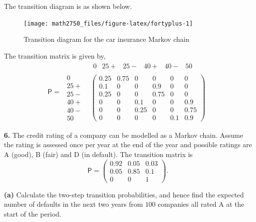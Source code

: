 \documentclass[
  a4paper,
]{article}
\theoremstyle{definition}
\theoremstyle{definition}
\theoremstyle{definition}
\theoremstyle{remark}
\begin{document}
\begin{myanswers}
The transition diagram is as shown below.

\begin{figure}

{\centering \texttt{[image: math2750\_files/figure-latex/fortyplus-1]} 

}

\caption{Transition diagram for the car insurance Markov chain}\label{fig:fortyplus}
\end{figure}

The transition matrix is given by,
\[ \mathsf P = 
    \begin{matrix}
    & \begin{matrix} 
        0 & 25+ & 25- & 40+ & 40- & 50
      \end{matrix} \\
    \begin{matrix}
      0 \\ 25+ \\ 25- \\ 40+ \\ 40- \\ 50
    \end{matrix}
    &
    \begin{pmatrix}
    0.25 & 0.75 & 0    & 0    & 0   & 0    \\
      0.1  & 0    & 0    & 0.9  & 0   & 0    \\
      0.25 & 0    & 0    & 0.75 & 0   & 0    \\
      0    & 0    & 0.1  & 0    & 0   & 0.9  \\
      0    & 0    & 0.25 & 0    & 0   & 0.75 \\
      0    & 0    & 0    & 0    & 0.1 & 0.9 
    \end{pmatrix}
    \end{matrix}
    \]

\end{myanswers}

\textbf{6.} The credit rating of a company can be modelled as a Markov chain. Assume the rating is assessed once per year at the end of the year and possible ratings are A (good), B (fair) and D (in default). The transition matrix is
\[\mathsf P=\begin{pmatrix} 0.92&0.05&0.03\\
0.05&0.85&0.1\\
0&0&1 \end{pmatrix} . \]

\textbf{(a)} Calculate the two-step transition probabilities, and hence find the expected number of defaults in the next two years from \(100\) companies all rated A at the start of the period.
\end{document}
